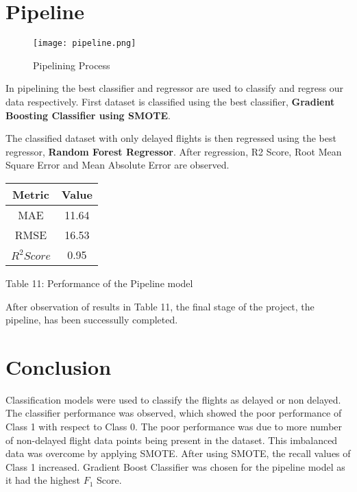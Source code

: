 \documentclass[12pt,letter-paper]{article}
\begin{document}
\section{Pipeline}

    \begin{figure}[H]%
        \begin{center}
            \texttt{[image: pipeline.png]}%
                \caption{Pipelining Process}
        \end{center}
    \end{figure}
    
    In pipelining the best classifier and regressor  are used to classify and regress our data respectively. First dataset is classified using the best classifier, {\bfseries Gradient Boosting Classifier using SMOTE}. 
    
    The classified dataset with only delayed flights is then regressed using the best regressor, {\bfseries Random Forest Regressor}. After regression, R2 Score, Root Mean Square Error and Mean Absolute Error are observed.

    \begin{center}
        \begin{tabular}{ |c|c|} 
         \hline
         Metric & Value\\ 
         \hline
         MAE & 11.64 \\  
         \hline
         RMSE & 16.53\\ 
         \hline
         $R^2 Score$ & 0.95\\ 
         \hline
        \end{tabular}
    \end{center}
    \begin{center}
            Table 11: Performance of the Pipeline model
    \end{center}
    
    After observation of results in Table 11, the final stage of the project, the pipeline, has been successully completed. 
\section{Conclusion}
    
    Classification models were used to classify the flights as delayed or non delayed. The classifier performance was observed, which showed the poor performance of Class 1 with respect to Class 0. The poor performance was due to more number of non-delayed flight data points being present in the dataset. This imbalanced data was overcome by applying SMOTE. After using SMOTE, the recall values of Class 1 increased. Gradient Boost Classifier was chosen for the pipeline model as it had the highest $F_1$ Score.
    
\end{document}
